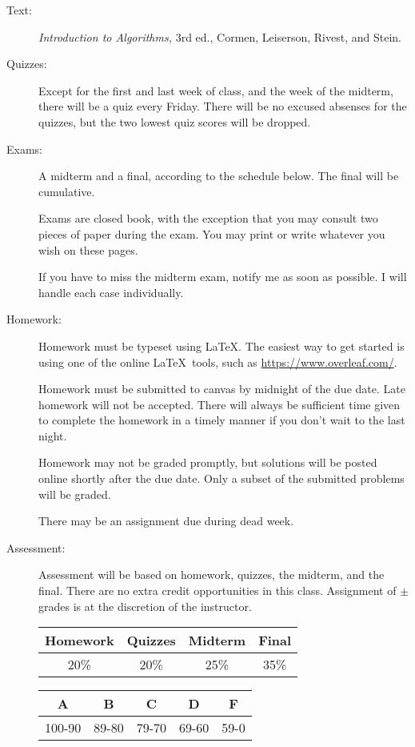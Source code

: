 \documentclass{article}
\begin{document}
\begin{description}
  \item[Text:] {\em Introduction to Algorithms,} 3rd ed., Cormen,
    Leiserson, Rivest, and Stein.


\item[Quizzes:] Except for the first and last week of class, and the
  week of the midterm, there will be a quiz every Friday.  There will
  be no excused absenses for the quizzes, but the two lowest quiz
  scores will be dropped.

\item[Exams:] A midterm and a final, according to the schedule below.
  The final will be cumulative.

  Exams are closed book, with the exception that you may consult two
  pieces of paper during the exam.  You may print or write whatever
  you wish on these pages.

  If you have to miss the midterm exam, notify me as soon as
  possible.  I will handle each case individually.

\item[Homework:] Homework must be typeset using \LaTeX.  The easiest
  way to get started is using one of the online \LaTeX\ tools, such as
  \url{https://www.overleaf.com/}.

   Homework must be submitted to canvas by midnight of the due date.
   Late homework will not be accepted.  There will always be
   sufficient time given to complete the homework in a timely manner
   if you don't wait to the last night.

   Homework may not be graded promptly, but solutions will be posted
   online shortly after the due date.  Only a subset of the submitted
   problems will be graded.

   There may be an assignment due during dead week.

 \item[Assessment:] Assessment will be based on homework, quizzes, the
   midterm, and the final.  There are no extra credit opportunities in
   this class.  Assignment of $\pm$ grades is at the discretion of the
   instructor. 

   \begin{tabular}{|c|c|c|c|}\hline
     Homework & Quizzes & Midterm & Final\\\hline
       20\% & 20\% & 25\%& 35\%\\\hline
   \end{tabular}
   \hfill
   \begin{tabular}{|c|c|c|c|c|}\hline
     A & B & C & D & F\\\hline
    100-90& 89-80 & 79-70 & 69-60 & 59-0\\\hline
   \end{tabular}



\end{description}
\end{document}
